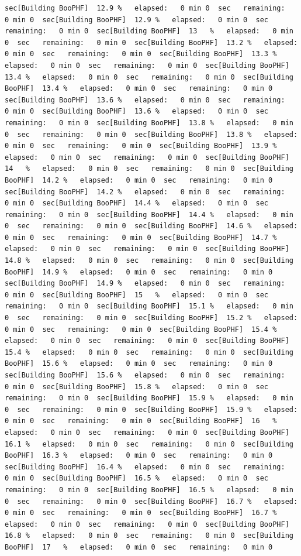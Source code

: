 \documentclass[
]{book}
\begin{document}
\begin{verbatim}
sec[Building BooPHF]  12.9 %   elapsed:   0 min 0  sec   remaining:   0 min 0  sec[Building BooPHF]  12.9 %   elapsed:   0 min 0  sec   remaining:   0 min 0  sec[Building BooPHF]  13   %   elapsed:   0 min 0  sec   remaining:   0 min 0  sec[Building BooPHF]  13.2 %   elapsed:   0 min 0  sec   remaining:   0 min 0  sec[Building BooPHF]  13.3 %   elapsed:   0 min 0  sec   remaining:   0 min 0  sec[Building BooPHF]  13.4 %   elapsed:   0 min 0  sec   remaining:   0 min 0  sec[Building BooPHF]  13.4 %   elapsed:   0 min 0  sec   remaining:   0 min 0  sec[Building BooPHF]  13.6 %   elapsed:   0 min 0  sec   remaining:   0 min 0  sec[Building BooPHF]  13.6 %   elapsed:   0 min 0  sec   remaining:   0 min 0  sec[Building BooPHF]  13.8 %   elapsed:   0 min 0  sec   remaining:   0 min 0  sec[Building BooPHF]  13.8 %   elapsed:   0 min 0  sec   remaining:   0 min 0  sec[Building BooPHF]  13.9 %   elapsed:   0 min 0  sec   remaining:   0 min 0  sec[Building BooPHF]  14   %   elapsed:   0 min 0  sec   remaining:   0 min 0  sec[Building BooPHF]  14.2 %   elapsed:   0 min 0  sec   remaining:   0 min 0  sec[Building BooPHF]  14.2 %   elapsed:   0 min 0  sec   remaining:   0 min 0  sec[Building BooPHF]  14.4 %   elapsed:   0 min 0  sec   remaining:   0 min 0  sec[Building BooPHF]  14.4 %   elapsed:   0 min 0  sec   remaining:   0 min 0  sec[Building BooPHF]  14.6 %   elapsed:   0 min 0  sec   remaining:   0 min 0  sec[Building BooPHF]  14.7 %   elapsed:   0 min 0  sec   remaining:   0 min 0  sec[Building BooPHF]  14.8 %   elapsed:   0 min 0  sec   remaining:   0 min 0  sec[Building BooPHF]  14.9 %   elapsed:   0 min 0  sec   remaining:   0 min 0  sec[Building BooPHF]  14.9 %   elapsed:   0 min 0  sec   remaining:   0 min 0  sec[Building BooPHF]  15   %   elapsed:   0 min 0  sec   remaining:   0 min 0  sec[Building BooPHF]  15.1 %   elapsed:   0 min 0  sec   remaining:   0 min 0  sec[Building BooPHF]  15.2 %   elapsed:   0 min 0  sec   remaining:   0 min 0  sec[Building BooPHF]  15.4 %   elapsed:   0 min 0  sec   remaining:   0 min 0  sec[Building BooPHF]  15.4 %   elapsed:   0 min 0  sec   remaining:   0 min 0  sec[Building BooPHF]  15.6 %   elapsed:   0 min 0  sec   remaining:   0 min 0  sec[Building BooPHF]  15.6 %   elapsed:   0 min 0  sec   remaining:   0 min 0  sec[Building BooPHF]  15.8 %   elapsed:   0 min 0  sec   remaining:   0 min 0  sec[Building BooPHF]  15.9 %   elapsed:   0 min 0  sec   remaining:   0 min 0  sec[Building BooPHF]  15.9 %   elapsed:   0 min 0  sec   remaining:   0 min 0  sec[Building BooPHF]  16   %   elapsed:   0 min 0  sec   remaining:   0 min 0  sec[Building BooPHF]  16.1 %   elapsed:   0 min 0  sec   remaining:   0 min 0  sec[Building BooPHF]  16.3 %   elapsed:   0 min 0  sec   remaining:   0 min 0  sec[Building BooPHF]  16.4 %   elapsed:   0 min 0  sec   remaining:   0 min 0  sec[Building BooPHF]  16.5 %   elapsed:   0 min 0  sec   remaining:   0 min 0  sec[Building BooPHF]  16.5 %   elapsed:   0 min 0  sec   remaining:   0 min 0  sec[Building BooPHF]  16.7 %   elapsed:   0 min 0  sec   remaining:   0 min 0  sec[Building BooPHF]  16.7 %   elapsed:   0 min 0  sec   remaining:   0 min 0  sec[Building BooPHF]  16.8 %   elapsed:   0 min 0  sec   remaining:   0 min 0  sec[Building BooPHF]  17   %   elapsed:   0 min 0  sec   remaining:   0 min 0  
\end{verbatim}
\end{document}
